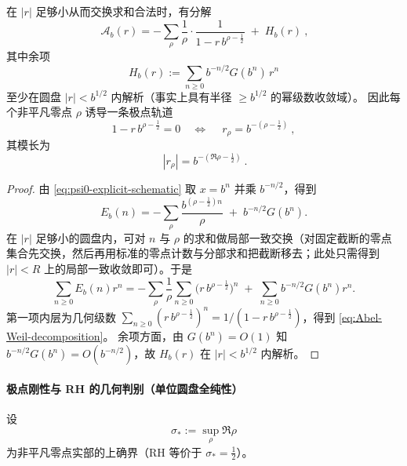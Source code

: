 \begin{theorem}\label{thm:discrete-abel-weil-expansion}
在 \(|r|\) 足够小从而交换求和合法时，有分解
\begin{equation}\label{eq:Abel-Weil-decomposition}
\boxed{\ \mathcal A_b(r)
=-\sum_{\rho}\frac{1}{\rho}\cdot\frac{1}{1-r\,b^{\rho-\frac12}}
\;+\;H_b(r)\ },
\end{equation}
其中余项
\[
H_b(r):=\sum_{n\ge 0}b^{-n/2}G(b^n)\,r^n
\]
至少在圆盘 \(|r|<b^{1/2}\) 内解析（事实上具有半径 \(\ge b^{1/2}\) 的幂级数收敛域）。
因此每个非平凡零点 \(\rho\) 诱导一条极点轨道
\[
1-r\,b^{\rho-\frac12}=0
\quad\Longleftrightarrow\quad
\boxed{\ r_\rho=b^{-(\rho-\frac12)}\ },
\]
其模长为
\[
\boxed{\ |r_\rho|=b^{-(\Re\rho-\frac12)}\ }.
\]
\end{theorem}
\begin{proof}
由 \eqref{eq:psi0-explicit-schematic} 取 \(x=b^n\) 并乘 \(b^{-n/2}\)，得到
\[
E_b(n)
=-\sum_\rho \frac{b^{(\rho-\frac12)n}}{\rho}
\;+\;b^{-n/2}G(b^n).
\]
在 \(|r|\) 足够小的圆盘内，可对 \(n\) 与 \(\rho\) 的求和做局部一致交换（对固定截断的零点集合先交换，然后再用标准的零点计数与分部求和把截断移去；此处只需得到 \(|r|<R\) 上的局部一致收敛即可）。于是
\[
\sum_{n\ge 0}E_b(n)r^n
=-\sum_\rho \frac{1}{\rho}\sum_{n\ge 0}\bigl(r\,b^{\rho-\frac12}\bigr)^n
\;+\;\sum_{n\ge 0}b^{-n/2}G(b^n)r^n.
\]
第一项内层为几何级数 \(\sum_{n\ge 0}(r\,b^{\rho-\frac12})^n=1/(1-r\,b^{\rho-\frac12})\)，得到 \eqref{eq:Abel-Weil-decomposition}。
余项方面，由 \(G(b^n)=O(1)\) 知 \(b^{-n/2}G(b^n)=O(b^{-n/2})\)，故 \(H_b(r)\) 在 \(|r|<b^{1/2}\) 内解析。
\end{proof}

\paragraph{极点刚性与 RH 的几何判别（单位圆盘全纯性）}
设
\[
\sigma_*:=\sup_{\rho}\Re\rho
\]
为非平凡零点实部的上确界（RH 等价于 \(\sigma_*=\tfrac12\)）。

